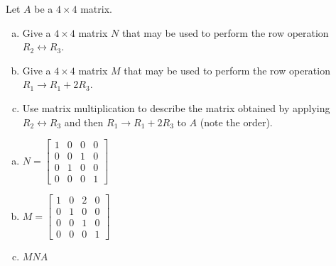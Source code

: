 
\begin{exerciseStatement}


Let \(A\) be a \(4 \times 4\) matrix.


\begin{enumerate}[(a)]
\item Give a \(4 \times 4\) matrix \(N\) that may be used to perform the row operation \( R_2 \leftrightarrow R_3 \).
\item Give a \(4 \times 4\) matrix \(M\) that may be used to perform the row operation \( R_1 \to R_1 + 2R_3 \).
\item Use matrix multiplication to describe the matrix obtained by applying \( R_2 \leftrightarrow R_3 \) and then \( R_1 \to R_1 + 2R_3 \) to \(A\) (note the order). 
\end{enumerate}
    
\end{exerciseStatement}
    
\begin{exerciseAnswer} 

\begin{enumerate}[(a)]
\item \(N= \left[\begin{array}{cccc}
1 & 0 & 0 & 0 \\
0 & 0 & 1 & 0 \\
0 & 1 & 0 & 0 \\
0 & 0 & 0 & 1
\end{array}\right] \)
\item \(M= \left[\begin{array}{cccc}
1 & 0 & 2 & 0 \\
0 & 1 & 0 & 0 \\
0 & 0 & 1 & 0 \\
0 & 0 & 0 & 1
\end{array}\right] \)
\item \(MNA\)
\end{enumerate}
    
\end{exerciseAnswer}
    
